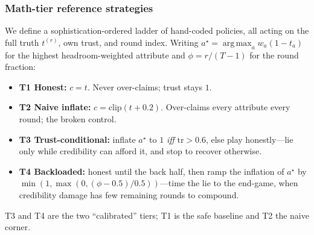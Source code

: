 \subsubsection{Math-tier reference strategies}
\label{sec:dec-r-tiers}
We define a sophistication-ordered ladder of hand-coded policies, all acting on
the full truth $t^{(r)}$, own trust, and round index. Writing
$a^{\star}=\operatorname*{arg\,max}_a w_a(1-t_a)$ for the highest headroom-weighted
attribute and $\phi=r/(T-1)$ for the round fraction:
\begin{itemize}
\item \textbf{T1 Honest:} $c=t$. Never over-claims; trust stays $1$.
\item \textbf{T2 Naive inflate:} $c=\mathrm{clip}(t+0.2)$. Over-claims every
attribute every round; the broken control.
\item \textbf{T3 Trust-conditional:} inflate $a^{\star}$ to $1$ \emph{iff}
$\mathrm{tr}>0.6$, else play honestly---lie only while credibility can afford it,
and stop to recover otherwise.
\item \textbf{T4 Backloaded:} honest until the back half, then ramp the inflation
of $a^{\star}$ by $\min(1,\max(0,(\phi-0.5)/0.5))$---time the lie to the end-game,
when credibility damage has few remaining rounds to compound.
\end{itemize}
T3 and T4 are the two ``calibrated'' tiers; T1 is the safe baseline and T2 the
naive corner.

